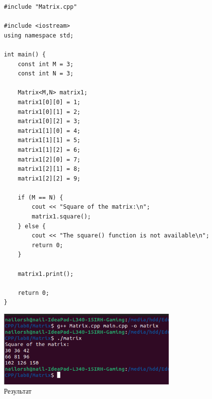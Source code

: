 \documentclass[a4paper, 14pt]{extarticle}
\begin{document}
\begin{figure}[!htb]
\begin{lstlisting}[language={},caption={Проверка работоспособности},label={lst:main}]
#include "Matrix.cpp"

#include <iostream>
using namespace std;

int main() {
    const int M = 3;
    const int N = 3;
    
    Matrix<M,N> matrix1;
    matrix1[0][0] = 1;
    matrix1[0][1] = 2;
    matrix1[0][2] = 3;
    matrix1[1][0] = 4;
    matrix1[1][1] = 5;
    matrix1[1][2] = 6;
    matrix1[2][0] = 7;
    matrix1[2][1] = 8;
    matrix1[2][2] = 9;

    if (M == N) {
    	cout << "Square of the matrix:\n";
        matrix1.square();
    } else {
    	cout << "The square() function is not available\n";
    	return 0;
    }
    
    matrix1.print();
    
    return 0;
}
\end{lstlisting}
\end{figure}


\begin{figure}[!htb]
	\centering
	\includegraphics[width=0.8\textwidth]{output.png}
\caption{Результат}
\label{fig:output}
\end{figure}
\end{document}

